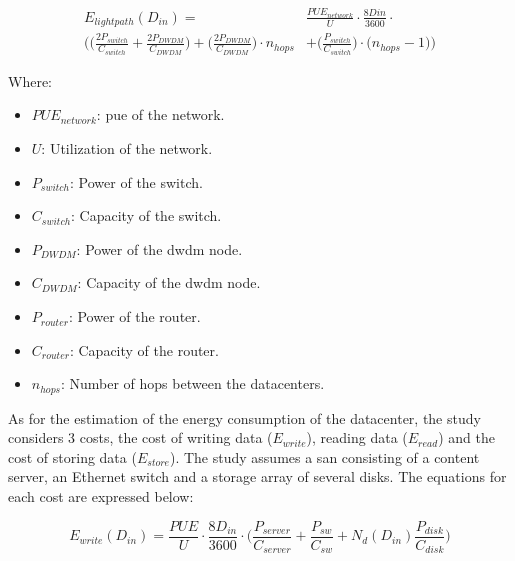 \begin{equation}
\label{formula:tall_lightpath}
\begin{split}
    E_{lightpath}(D_{in}) = & \frac{PUE_{network}}{U} \cdot \frac{8D{in}}{3600} \cdot \\
    \Bigg( \bigg( \frac{2P_{switch}}{C_{switch}} + \frac{2P_{DWDM}}{C_{DWDM}} \bigg) + \bigg(\frac{2P_{DWDM}}{C_{DWDM}}\bigg) \cdot n_{hops} & + \bigg( \frac{P_{switch}}{C_{switch}} \bigg) \cdot \bigg( n_{hops} - 1 \bigg) \Bigg)
\end{split}
\end{equation}

Where:

\begin{itemize}
    \item $PUE_{network}$: \ac{pue} of the network.
    \item $U$: Utilization of the network.
    \item $P_{switch}$: Power of the switch.
    \item $C_{switch}$: Capacity of the switch.
    \item $P_{DWDM}$: Power of the \ac{dwdm} node.
    \item $C_{DWDM}$: Capacity of the \ac{dwdm} node.
    \item $P_{router}$: Power of the router.
    \item $C_{router}$: Capacity of the router.
    \item $n_{hops}$: Number of hops between the datacenters.
\end{itemize}

As for the estimation of the energy consumption of the datacenter, the study considers 3 costs, the cost of writing data ($E_{write}$), reading data ($E_{read}$) and the cost of storing data ($E_{store}$). The study assumes a \ac{san} consisting of a content server, an Ethernet switch and a storage array of several disks. The equations for each cost are expressed below:

\begin{equation}
\label{formula:tall_datacenter_write}
    E_{write}(D_{in}) = \frac{PUE}{U} \cdot \frac{8D_{in}}{3600} \cdot \bigg(\frac{P_{server}}{C_{server}} + \frac{P_{sw}}{C_{sw}} + N_d(D_{in}) \frac{P_{disk}}{C_{disk}}  \bigg) 
\end{equation}

